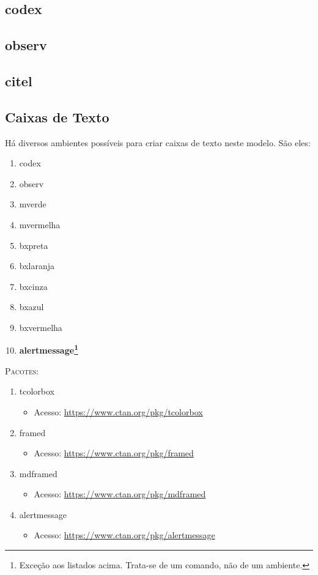 \documentclass[a4paper,12pt,oneside,openright,extrafontsizes,openbib]{memoir}
\begin{document}
{{\subsection{codex}\label{subsec:codex}

\subsection{observ}\label{subsec:observ}

\subsection{citel}\label{subsec:citel}

\subsection{Caixas de Texto}\label{subsec:caixatextos}

Há diversos ambientes possíveis para criar caixas de texto neste modelo. São eles:

\begin{enumerate}
    \item codex
    \item observ
    \item mverde
    \item mvermelha
    \item bxpreta
    \item bxlaranja
    \item bxcinza
    \item bxazul
    \item bxvermelha
    \item \textbf{alertmessage\footnote{Exceção aos listados acima. Trata-se de um comando, não de um ambiente.}}
\end{enumerate}

\textsc{Pacotes:}
\begin{enumerate}
    \item tcolorbox
    \begin{itemize}
        \item Acesso: \url{https://www.ctan.org/pkg/tcolorbox}
    \end{itemize}
    \item framed
    \begin{itemize}
        \item Acesso: \url{https://www.ctan.org/pkg/framed}
    \end{itemize}
    \item mdframed
    \begin{itemize}
        \item Acesso: \url{https://www.ctan.org/pkg/mdframed}
    \end{itemize}
    \item alertmessage
    \begin{itemize}
        \item Acesso: \url{https://www.ctan.org/pkg/alertmessage}
    \end{itemize}
\end{enumerate}

}}
\end{document}
